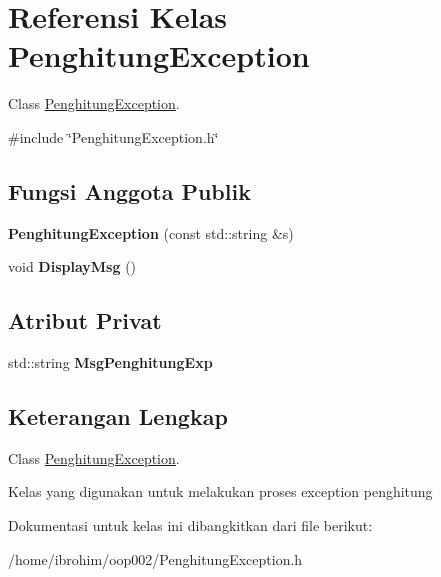 \hypertarget{classPenghitungException}{}\section{Referensi Kelas Penghitung\+Exception}
\label{classPenghitungException}


Class \hyperlink{classPenghitungException}{Penghitung\+Exception}.  




{\ttfamily \#include \char`\"{}Penghitung\+Exception.\+h\char`\"{}}

\subsection*{Fungsi Anggota Publik}
\begin{DoxyCompactItemize}
\item 
\hypertarget{classPenghitungException_a988a376427f299e37cc8812497a0f0d4}{}{\bfseries Penghitung\+Exception} (const std\+::string \&s)\label{classPenghitungException_a988a376427f299e37cc8812497a0f0d4}

\item 
\hypertarget{classPenghitungException_aac32ab678c77a1b69229d89e6ed77405}{}void {\bfseries Display\+Msg} ()\label{classPenghitungException_aac32ab678c77a1b69229d89e6ed77405}

\end{DoxyCompactItemize}
\subsection*{Atribut Privat}
\begin{DoxyCompactItemize}
\item 
\hypertarget{classPenghitungException_a435204339c594f488cf7f9e71d705f54}{}std\+::string {\bfseries Msg\+Penghitung\+Exp}\label{classPenghitungException_a435204339c594f488cf7f9e71d705f54}

\end{DoxyCompactItemize}


\subsection{Keterangan Lengkap}
Class \hyperlink{classPenghitungException}{Penghitung\+Exception}. 

Kelas yang digunakan untuk melakukan proses exception penghitung 

Dokumentasi untuk kelas ini dibangkitkan dari file berikut\+:\begin{DoxyCompactItemize}
\item 
/home/ibrohim/oop002/Penghitung\+Exception.\+h\end{DoxyCompactItemize}
